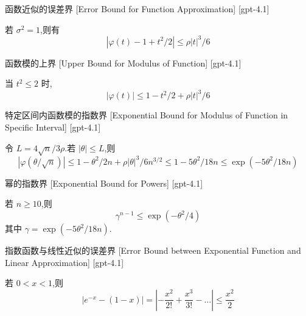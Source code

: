 \documentclass[UTF8]{ctexart}
\begin{document}
    
    
    \begin{ppt}
        {函数近似的误差界}
        [Error Bound for Function Approximation]
        [gpt-4.1]
        
若 $\sigma^2 = 1$,则有
\[
|\varphi(t) - 1 + t^2 / 2| \leq \rho |t|^3 / 6
\]

    \end{ppt}
    
    
    
    \begin{ppt}
        {函数模的上界}
        [Upper Bound for Modulus of Function]
        [gpt-4.1]
        
当 $t^2 \leq 2$ 时,
\[
|\varphi(t)| \leq 1 - t^2 / 2 + \rho |t|^3 / 6
\]

    \end{ppt}
    
    
    
    \begin{ppt}
        {特定区间内函数模的指数界}
        [Exponential Bound for Modulus of Function in Specific Interval]
        [gpt-4.1]
        
令 $L = 4\sqrt{n} / 3\rho$.若 $|\theta| \leq L$,则
\[
|\varphi(\theta/\sqrt{n})| \leq 1 - \theta^2 / 2n + \rho |\theta|^3 / 6n^{3/2} \leq 1 - 5\theta^2 / 18n \leq \exp(-5\theta^2 / 18n)
\]

    \end{ppt}
    
    
    
    \begin{ppt}
        {幂的指数界}
        [Exponential Bound for Powers]
        [gpt-4.1]
        
若 $n \geq 10$,则
\[
\gamma^{n-1} \leq \exp(-\theta^2 / 4)
\]
其中 $\gamma = \exp(-5\theta^2 / 18n)$.

    \end{ppt}
    
    
    
    \begin{ppt}
        {指数函数与线性近似的误差界}
        [Error Bound between Exponential Function and Linear Approximation]
        [gpt-4.1]
        
若 $0 < x < 1$,则
\[
|e^{-x} - (1 - x)| = \left| -\frac{x^2}{2!} + \frac{x^3}{3!} - \ldots \right| \leq \frac{x^2}{2}
\]

    \end{ppt}
    
\end{document}
